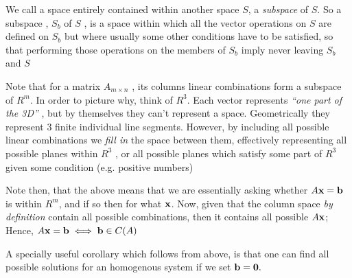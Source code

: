 \documentclass[english,course]{Notes}
\newcommand{\ita}[1]{\textit{#1}}
\begin{document}
	      	
	      	\par{We call a space entirely contained within another space $S$, a \ita{subspace} of $S$. So a subspace , $S_{b}$ of $S$ , is a space within which all the vector operations on $S$ are defined on $S_{b}$ but where usually some other conditions have to be satisfied, so that performing those operations on the members of $S_{b}$ imply never leaving $S_{b}$ and $S$ }
	      	
	      	\par{Note that for a matrix $A_{m \times n}$ , its columns linear combinations form a subspace of $R^{m}$. In order to picture why, think of $R^{3}$. Each vector represents \ita{``one part of the 3D''} , but by themselves they can't represent a space. Geometrically they represent 3 finite individual line segments. However, by including all possible linear combinations we \ita{fill in} the space between them, effectively representing all possible planes within $R^{3}$ , or all possible planes which satisfy some part of $R^{3}$ given some condition (e.g. positive numbers) }
	      	
	      	
	      	\par{Note then, that the above means that we are essentially asking whether $A\mathbf{x} = \mathbf{b}$ is within $R^{m}$, and if so then for what $\mathbf{x}$. Now, given that the column space \ita{by definition} contain all possible combinations, then it contains all possible $A\mathbf{x}$; Hence,  $A\mathbf{x} = \mathbf{b} \iff \mathbf{b} \in C(A)$ }
	      	
	      	
	      	\par{A specially useful corollary which follows from above, is that one can find all possible solutions for an homogenous system if we set $\mathbf{b} = \mathbf{0}.$}
	      	
	      	
	      	\newpage
\end{document}
